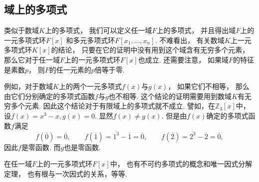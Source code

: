 \subsection{域上的多项式}
类似于数域\(K\)上的多项式，
我们可以定义任一域\(F\)上的多项式，
并且得出域\(F\)上的一元多项式环\(F[x]\)
和多元多项式环\(F[x_1,\dotsc,x_n]\).
不难看出，
有关数域\(K\)上一元多项式环\(K[x]\)的结论，
只要在它的证明中没有用到这个域含有无穷多个元素，
那么它对于任一域\(F\)上的一元多项式环\(F[x]\)也成立.
还需要注意，
如果域\(F\)的特征是素数\(p\)，
则\(F\)的任一元素的\(p\)倍等于零.

例如，对于数域\(K\)上的两个一元多项式\(f(x)\)与\(g(x)\)，
如果它们不相等，
那么由它们分别确定的多项式函数\(f\)与\(g\)也不相等.
这个结论的证明需要用到数域\(K\)有无穷多个元素.
因此这个结论对于有限域上的多项式就不成立.
譬如，在\(\mathbb{Z}_3[x]\)中，
设\(f(x)=x^3-x,
g(x)=0\).
显然\(f(x) \neq g(x)\).
但是由\(f(x)\)确定的多项式函数\(f\)满足\begin{equation*}
	f(\overline0)=\overline0, \qquad
	f(\overline1)=\overline{1^3}-\overline1=\overline0, \qquad
	f(\overline2)=\overline{2^3}-\overline2=\overline0,
\end{equation*}
因此\(f\)是零函数.
而\(g\)也是零函数.

在任一域\(F\)上的一元多项式环\(F[x]\)中，
也有不可约多项式的概念和唯一因式分解定理，
也有根与一次因式的关系，等等.
